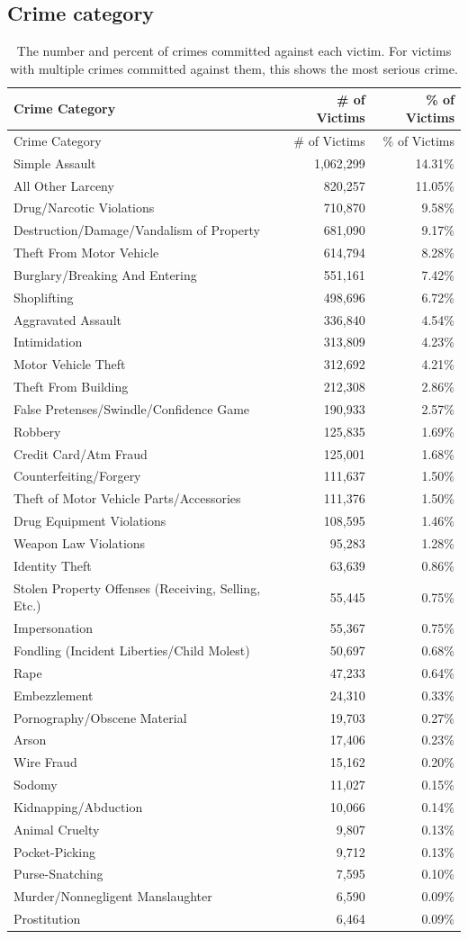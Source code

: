 \documentclass[
  12pt,
  openany]{book}
\begin{document}
\hypertarget{crime-category-1}{%
\subsection{Crime category}\label{crime-category-1}}

\begin{longtable}[]{@{}lrr@{}}
\caption{\label{tab:victimCrimeCategory}The number and percent of crimes committed against each victim. For victims with multiple crimes committed against them, this shows the most serious crime.}\tabularnewline
\toprule
Crime Category & \# of Victims & \% of Victims\tabularnewline
\midrule
\endfirsthead
\toprule
Crime Category & \# of Victims & \% of Victims\tabularnewline
\midrule
\endhead
Simple Assault & 1,062,299 & 14.31\%\tabularnewline
All Other Larceny & 820,257 & 11.05\%\tabularnewline
Drug/Narcotic Violations & 710,870 & 9.58\%\tabularnewline
Destruction/Damage/Vandalism of Property & 681,090 & 9.17\%\tabularnewline
Theft From Motor Vehicle & 614,794 & 8.28\%\tabularnewline
Burglary/Breaking And Entering & 551,161 & 7.42\%\tabularnewline
Shoplifting & 498,696 & 6.72\%\tabularnewline
Aggravated Assault & 336,840 & 4.54\%\tabularnewline
Intimidation & 313,809 & 4.23\%\tabularnewline
Motor Vehicle Theft & 312,692 & 4.21\%\tabularnewline
Theft From Building & 212,308 & 2.86\%\tabularnewline
False Pretenses/Swindle/Confidence Game & 190,933 & 2.57\%\tabularnewline
Robbery & 125,835 & 1.69\%\tabularnewline
Credit Card/Atm Fraud & 125,001 & 1.68\%\tabularnewline
Counterfeiting/Forgery & 111,637 & 1.50\%\tabularnewline
Theft of Motor Vehicle Parts/Accessories & 111,376 & 1.50\%\tabularnewline
Drug Equipment Violations & 108,595 & 1.46\%\tabularnewline
Weapon Law Violations & 95,283 & 1.28\%\tabularnewline
Identity Theft & 63,639 & 0.86\%\tabularnewline
Stolen Property Offenses (Receiving, Selling, Etc.) & 55,445 & 0.75\%\tabularnewline
Impersonation & 55,367 & 0.75\%\tabularnewline
Fondling (Incident Liberties/Child Molest) & 50,697 & 0.68\%\tabularnewline
Rape & 47,233 & 0.64\%\tabularnewline
Embezzlement & 24,310 & 0.33\%\tabularnewline
Pornography/Obscene Material & 19,703 & 0.27\%\tabularnewline
Arson & 17,406 & 0.23\%\tabularnewline
Wire Fraud & 15,162 & 0.20\%\tabularnewline
Sodomy & 11,027 & 0.15\%\tabularnewline
Kidnapping/Abduction & 10,066 & 0.14\%\tabularnewline
Animal Cruelty & 9,807 & 0.13\%\tabularnewline
Pocket-Picking & 9,712 & 0.13\%\tabularnewline
Purse-Snatching & 7,595 & 0.10\%\tabularnewline
Murder/Nonnegligent Manslaughter & 6,590 & 0.09\%\tabularnewline
Prostitution & 6,464 & 0.09\%\tabularnewline

\end{longtable}
\end{document}
